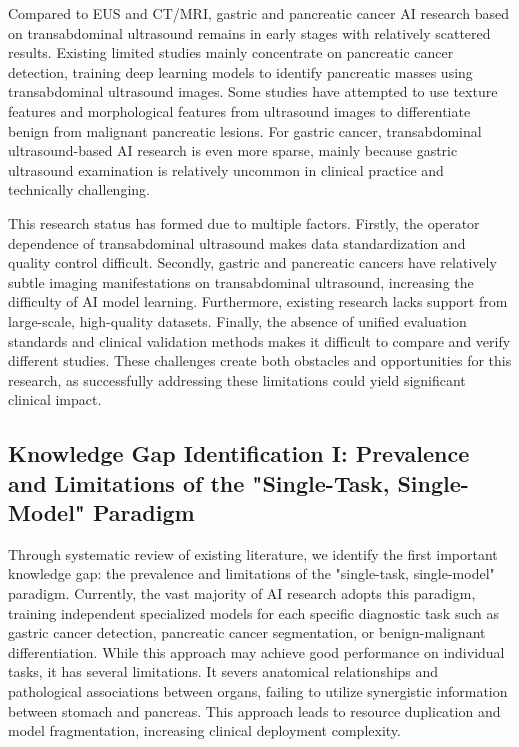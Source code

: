 Compared to EUS and CT/MRI, gastric and pancreatic cancer AI research based on transabdominal ultrasound remains in early stages with relatively scattered results. Existing limited studies mainly concentrate on pancreatic cancer detection, training deep learning models to identify pancreatic masses using transabdominal ultrasound images. Some studies have attempted to use texture features and morphological features from ultrasound images to differentiate benign from malignant pancreatic lesions. For gastric cancer, transabdominal ultrasound-based AI research is even more sparse, mainly because gastric ultrasound examination is relatively uncommon in clinical practice and technically challenging.

This research status has formed due to multiple factors. Firstly, the operator dependence of transabdominal ultrasound makes data standardization and quality control difficult. Secondly, gastric and pancreatic cancers have relatively subtle imaging manifestations on transabdominal ultrasound, increasing the difficulty of AI model learning. Furthermore, existing research lacks support from large-scale, high-quality datasets. Finally, the absence of unified evaluation standards and clinical validation methods makes it difficult to compare and verify different studies. These challenges create both obstacles and opportunities for this research, as successfully addressing these limitations could yield significant clinical impact.

\subsection{Knowledge Gap Identification I: Prevalence and Limitations of the "Single-Task, Single-Model" Paradigm}

Through systematic review of existing literature, we identify the first important knowledge gap: the prevalence and limitations of the "single-task, single-model" paradigm. Currently, the vast majority of AI research adopts this paradigm, training independent specialized models for each specific diagnostic task such as gastric cancer detection, pancreatic cancer segmentation, or benign-malignant differentiation. While this approach may achieve good performance on individual tasks, it has several limitations. It severs anatomical relationships and pathological associations between organs, failing to utilize synergistic information between stomach and pancreas. This approach leads to resource duplication and model fragmentation, increasing clinical deployment complexity.

